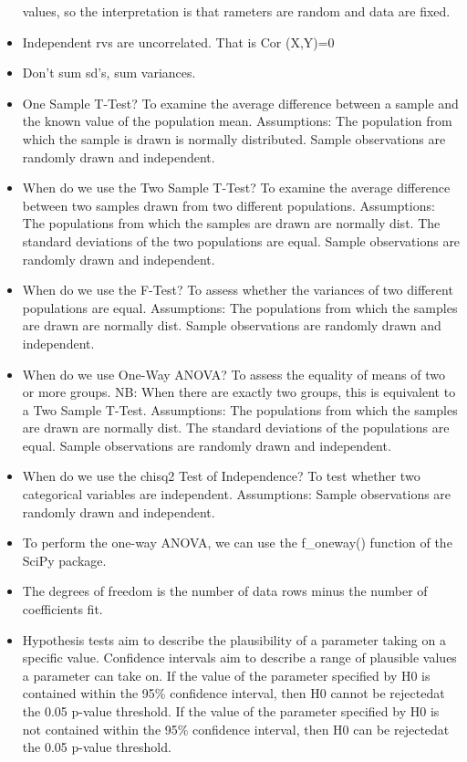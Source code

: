 \documentclass[]{book}
\theoremstyle{definition}
\theoremstyle{definition}
\theoremstyle{definition}
\theoremstyle{remark}
\begin{document}
\begin{itemize}
  values, so the interpretation is that rameters are random and data are
  fixed.
\item
  Independent rvs are uncorrelated. That is Cor (X,Y)=0
\item
  Don't sum sd's, sum variances.
\item
  One Sample T-Test? To examine the average difference between a sample
  and the known value of the population mean. Assumptions: The
  population from which the sample is drawn is normally distributed.
  Sample observations are randomly drawn and independent.
\item
  When do we use the Two Sample T-Test? To examine the average
  difference between two samples drawn from two different populations.
  Assumptions: The populations from which the samples are drawn are
  normally dist. The standard deviations of the two populations are
  equal. Sample observations are randomly drawn and independent.
\item
  When do we use the F-Test? To assess whether the variances of two
  different populations are equal. Assumptions: The populations from
  which the samples are drawn are normally dist. Sample observations are
  randomly drawn and independent.
\item
  When do we use One-Way ANOVA? To assess the equality of means of two
  or more groups. NB: When there are exactly two groups, this is
  equivalent to a Two Sample T-Test. Assumptions: The populations from
  which the samples are drawn are normally dist. The standard deviations
  of the populations are equal. Sample observations are randomly drawn
  and independent.
\item
  When do we use the chisq2 Test of Independence? To test whether two
  categorical variables are independent. Assumptions: Sample
  observations are randomly drawn and independent.
\item
  To perform the one-way ANOVA, we can use the f\_oneway() function of
  the SciPy package.
\item
  The degrees of freedom is the number of data rows minus the number of
  coefficients fit.
\item
  Hypothesis tests aim to describe the plausibility of a parameter
  taking on a specific value. Confidence intervals aim to describe a
  range of plausible values a parameter can take on. If the value of the
  parameter specified by H0 is contained within the 95\% confidence
  interval, then H0 cannot be rejectedat the 0.05 p-value threshold. If
  the value of the parameter specified by H0 is not contained within the
  95\% confidence interval, then H0 can be rejectedat the 0.05 p-value
  threshold.
\end{itemize}
\end{document}
